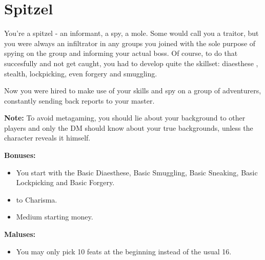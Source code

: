 \section{Spitzel}
You're a spitzel - an informant, a spy, a mole. Some would call you a traitor, but you were always an infiltrator in any groups you joined with the sole purpose of spying on the group and informing your actual boss. Of course, to do that succesfully and not get caught, you had to develop quite the skillset: diaesthese , stealth, lockpicking, even forgery and smuggling.

Now you were hired to make use of your skills and spy on a group of adventurers, constantly sending back reports to your master.

\textbf{Note:} To avoid metagaming, you should lie about your background to other players and only the DM should know about your true backgrounds, unless the character reveals it himself.

\textbf{Bonuses:}
\begin{itemize}
	\item You start with the Basic Diaesthese, Basic Smuggling, Basic Sneaking, Basic Lockpicking and Basic Forgery.
	\item {} to Charisma.
	\item Medium starting money.
\end{itemize}


\textbf{Maluses:}
\begin{itemize}
	\item You may only pick 10 feats at the beginning instead of the usual 16.
\end{itemize}
